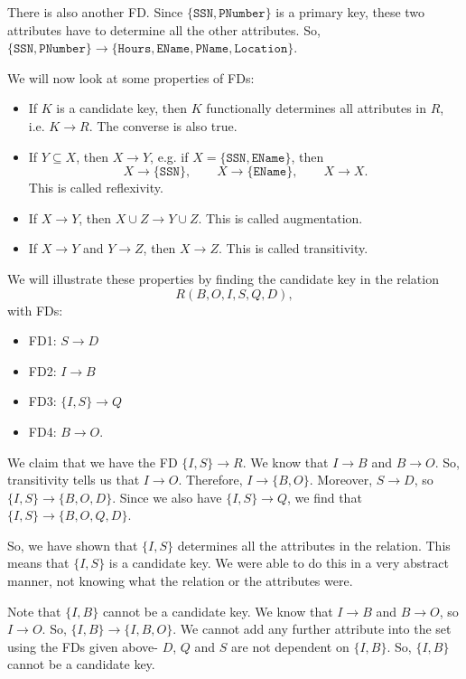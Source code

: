 \documentclass[a4paper, openany]{memoir}
\begin{document}
There is also another FD. Since $\{\texttt{SSN}, \texttt{PNumber}\}$ is a primary key, these two attributes have to determine all the other attributes. So, $\{\texttt{SSN}, \texttt{PNumber}\} \to \{\texttt{Hours}, \texttt{EName}, \texttt{PName}, \texttt{Location}\}$.

We will now look at some properties of FDs:
\begin{itemize}
    \item If $K$ is a candidate key, then $K$ functionally determines all attributes in $R$, i.e. $K \to R$. The converse is also true.
    
    \item If $Y \subseteq X$, then $X \to Y$, e.g. if $X = \{\texttt{SSN}, \texttt{EName}\}$, then
    \[X \to \{\texttt{SSN}\}, \qquad X \to \{\texttt{EName}\}, \qquad X \to X.\]
    This is called reflexivity.
    
    \item If $X \to Y$, then $X \cup Z \to Y \cup Z$. This is called augmentation.
    
    \item If $X \to Y$ and $Y \to Z$, then $X \to Z$. This is called transitivity.
\end{itemize}

We will illustrate these properties by finding the candidate key in the relation
\[R(B, O, I, S, Q, D),\]
with FDs:
\begin{itemize}
    \item FD1: $S \to D$
    \item FD2: $I \to B$
    \item FD3: $\{I, S\} \to Q$
    \item FD4: $B \to O$.
\end{itemize}
We claim that we have the FD $\{I, S\} \to R$. We know that $I \to B$ and $B \to O$. So, transitivity tells us that $I \to O$. Therefore, $I \to \{B, O\}$. Moreover, $S \to D$, so $\{I, S\} \to \{B, O, D\}$. Since we also have $\{I, S\} \to Q$, we find that $\{I, S\} \to \{B, O, Q, D\}$.

So, we have shown that $\{I, S\}$ determines all the attributes in the relation. This means that $\{I, S\}$ is a candidate key. We were able to do this in a very abstract manner, not knowing what the relation or the attributes were.

Note that $\{I, B\}$ cannot be a candidate key. We know that $I \to B$ and $B \to O$, so $I \to O$. So, $\{I, B\} \to \{I, B, O\}$. We cannot add any further attribute into the set using the FDs given above- $D$, $Q$ and $S$ are not dependent on $\{I, B\}$. So, $\{I, B\}$ cannot be a candidate key.
\end{document}
